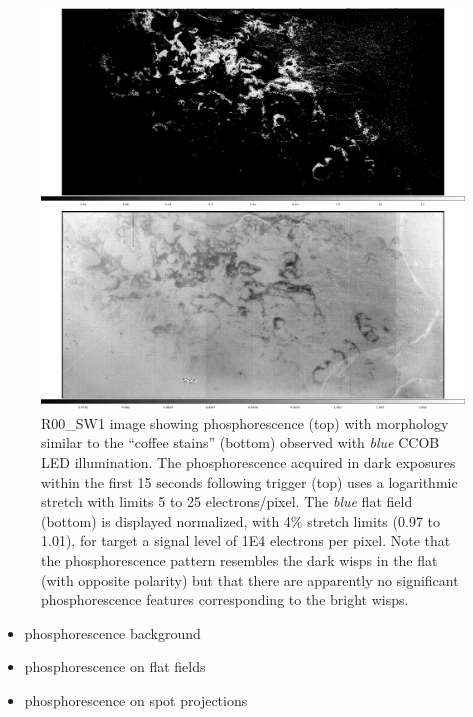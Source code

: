 \begin{figure}
\centering
\begin{minipage}{1.0\textwidth}    
  \centering
  \includegraphics[width=.95\linewidth]{sections/figures/phosphorescence-survey/stains_phos.png}    
\end{minipage}
\begin{minipage}{1.0\textwidth}
  \centering
  \includegraphics[width=.95\linewidth]{sections/figures/phosphorescence-survey/stains_abs.png}
\end{minipage}
\caption{R00\_SW1 image showing phosphorescence (top) with morphology similar to the ``coffee stains'' (bottom) observed with {\it blue} CCOB LED illumination. The phosphorescence acquired in dark exposures within the first 15 seconds following trigger (top) uses a logarithmic stretch with limits 5 to 25 electrons/pixel. The {\it blue} flat field (bottom) is displayed normalized, with 4\% stretch limits (0.97 to 1.01), for target a signal level of 1E4 electrons per pixel. Note that the phosphorescence pattern resembles the dark wisps in the flat (with opposite polarity) but that there are apparently no significant phosphorescence features corresponding to the bright wisps.}
\label{fig:phos:stains}
\end{figure}

\begin{itemize}
\tightlist
\item
  phosphorescence background
\item
  phosphorescence on flat fields
\item
  phosphorescence on spot projections
\end{itemize}

